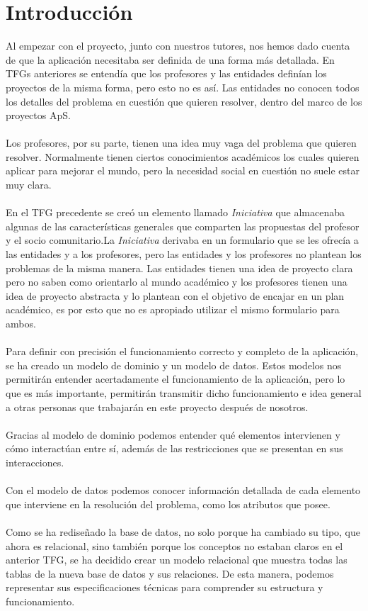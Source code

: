 \documentclass[11pt]{book}
\begin{document}
\section{Introducción}
Al empezar con el proyecto, junto con nuestros tutores, nos hemos dado cuenta de que la aplicación necesitaba ser definida de una forma más detallada. En TFGs anteriores se entendía que los profesores y las entidades definían los proyectos de la misma forma, pero esto no es así. Las entidades no conocen todos los detalles del problema en cuestión que quieren resolver, dentro del marco de los proyectos ApS.\\\\
Los profesores, por su parte, tienen una idea muy vaga del problema que quieren resolver. Normalmente tienen ciertos conocimientos académicos los cuales quieren aplicar para mejorar el mundo, pero la necesidad social en cuestión no suele estar muy clara.\\\\
En el TFG precedente se creó un elemento llamado \emph{Iniciativa} que almacenaba algunas de las características generales que comparten las propuestas del profesor y el socio comunitario.La \emph{Iniciativa} derivaba en un formulario que se les ofrecía a las entidades y a los profesores, pero las entidades y los profesores no plantean los problemas de la misma manera. Las entidades tienen una idea de proyecto clara pero no saben como orientarlo al mundo académico y los profesores tienen una idea de proyecto abstracta y lo plantean con el objetivo de encajar en un plan académico, es por esto que no es apropiado utilizar el mismo formulario para ambos.\\\\
Para definir con precisión el funcionamiento correcto y completo de la aplicación, se ha creado un modelo de dominio y un modelo de datos.
Estos modelos nos permitirán entender acertadamente el funcionamiento de la aplicación, pero lo que es más importante, permitirán transmitir dicho funcionamiento e idea general a otras personas que trabajarán en este proyecto después de nosotros.\\\\
Gracias al modelo de dominio podemos entender qué elementos intervienen y cómo interactúan entre sí, además de las restricciones que se presentan en sus interacciones.\\\\
Con el modelo de datos podemos conocer información detallada de cada elemento que interviene en la resolución del problema, como los atributos que posee.\\\\
Como se ha rediseñado la base de datos, no solo porque ha cambiado su tipo, que ahora es relacional, sino también porque los conceptos no estaban claros en el anterior TFG, se ha decidido crear un modelo relacional que muestra todas las tablas de la nueva base de datos y sus relaciones. De esta manera, podemos representar sus especificaciones técnicas para comprender su estructura y funcionamiento. 
\end{document}
